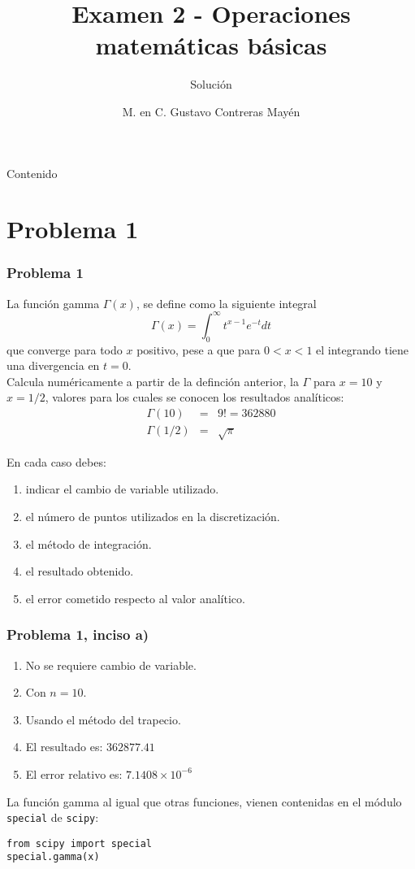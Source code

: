 


\title{Examen 2 - Operaciones matem\'{a}ticas b\'{a}sicas}
\subtitle{Soluci\'{o}n}
\author{M. en C. Gustavo Contreras May\'{e}n}
\maketitle
\fontsize{14}{14}\selectfont
{}
\begin{frame}{Contenido}
\tableofcontents[pausesections]
\end{frame}
\section{Problema 1}
\begin{frame}
\frametitle{Problema 1}
La funci\'{o}n gamma $\Gamma (x)$, se define como la siguiente integral
	\[ \Gamma (x) = \int_{0}^{\infty} t^{x-1} e^{-t} dt\]
	que converge para todo $x$ positivo, pese a que para $0<x<1$ el integrando tiene una divergencia en $t=0$.
	\\
	Calcula num\'{e}ricamente a partir de la definci\'{o}n anterior, la $\Gamma$ para $x=10$ y $x=1/2$, valores para los cuales se conocen los resultados anal\'{i}ticos:
	\begin{eqnarray*}
		\Gamma(10) &=& 9! = 362880 \\
		\Gamma(1/2) &=& \sqrt{\pi}
	\end{eqnarray*}
\end{frame}
\begin{frame}
En cada caso debes:
	\begin{enumerate}
		\item indicar el cambio de variable utilizado.
		\item el n\'{u}mero de puntos utilizados en la discretizaci\'{o}n.
		\item el m\'{e}todo de integraci\'{o}n.
		\item el resultado obtenido.
		\item el error cometido respecto al valor anal\'{i}tico.
	\end{enumerate}
\end{frame}
\begin{frame}[fragile]
\frametitle{Problema 1, inciso a)}
	\begin{enumerate}
		\item No se requiere cambio de variable.
		\item Con $n=10$.
		\item Usando el m\'{e}todo del trapecio.
		\item El resultado es: $362877.41$
		\item El error relativo es: $7.1408 \times 10^{-6}$
	\end{enumerate}
La funci\'{o}n gamma al igual que otras funciones, vienen contenidas en el m\'{o}dulo \texttt{special} de \texttt{scipy}:
\medskip
\begin{verbatim}
from scipy import special
special.gamma(x)
\end{verbatim}
\end{frame}
